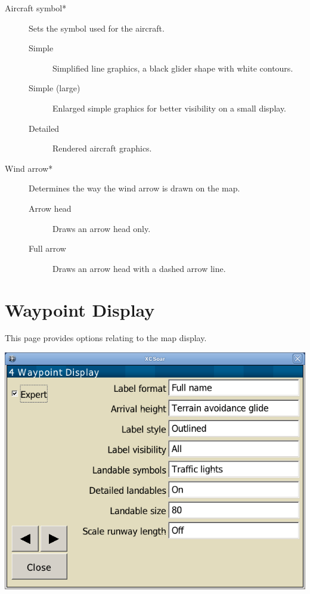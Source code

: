 \begin{description}
\item[Aircraft symbol*]  Sets the symbol used for the aircraft.
\begin{description}
 \item[Simple] Simplified line graphics, a black glider shape with white contours.
 \item[Simple (large)] Enlarged simple graphics for better visibility on a small display.
 \item[Detailed] Rendered aircraft graphics.
\end{description}

\item[Wind arrow*]  Determines the way the wind arrow is drawn on the map.
\begin{description}
 \item[Arrow head]  Draws an arrow head only.
 \item[Full arrow]  Draws an arrow head with a dashed arrow line.
\end{description}
\end{description}


\clearpage
\section{Waypoint Display}\label{sec:waypoint-display}

This page provides options relating to the map display.

\begin{center}
\includegraphics[angle=0,width=0.8\linewidth,keepaspectratio='true']{figures/config-map_waypoint.png}
\end{center}


